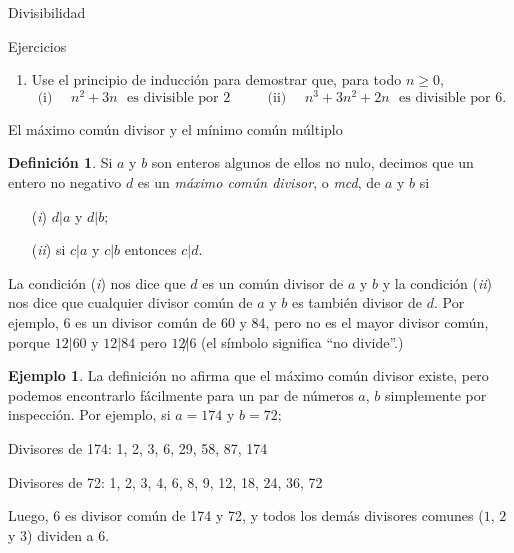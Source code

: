 \documentclass[11pt,spanish,makeidx]{amsbook}
\theoremstyle{definition}
\newtheorem{definicion}{Definici\'on}[section]
\newtheorem{ejemplo}{Ejemplo}[section]
\theoremstyle{remark}
\begin{document}
\begin{section}{Divisibilidad}
\begin{subsection}{Ejercicios}
\begin{enumerate}
\item Use el principio de inducción para demostrar que, para todo $n\ge0$,
$$
\text{ (i) } \quad n^2+3n \,\,\text{ es divisible por 2 } \qquad
\text{ (ii) } \quad n^3+3n^2+2n \,\,\text{ es divisible por 6. }
$$
\end{enumerate}
\end{subsection}
\end{section}

\begin{section}{El máximo común divisor y el mínimo común múltiplo}\label{1.7}

\begin{definicion}\label{mcd} Si $a$ y $b$ son enteros algunos de ellos no nulo, decimos que un entero no negativo $d$ es un {\em máximo común divisor}, o {\em mcd}, de $a$ y $b$ si
\begin{enumerate}
\item[({\em i})] $ d|a$ y $d|b$;
\item[({\em ii})] si $ c|a $ y $c|b$ entonces $ c|d$.
\end{enumerate}
\end{definicion}
La condición ({\em i}) nos dice que $d$ es un común divisor de $a$ y $b$ y la condición ({\em ii}) nos dice que cualquier divisor común de $a$ y $b$ es también divisor de $d$. Por ejemplo, 6 es un divisor común de 60 y 84, pero no es el mayor divisor común, porque $12|60$ y $12|84$ pero $12{\not|}6$ (el símbolo significa ``no divide''.)

\begin{ejemplo} La definición no afirma que el máximo común divisor existe, pero podemos encontrarlo fácilmente para un par de números $a$, $b$ simplemente por inspección. Por  ejemplo, si $a = 174$ y $b =72$;

Divisores de 174: 1, 2, 3, 6, 29, 58, 87, 174

Divisores de 72: 1, 2, 3, 4, 6, 8, 9, 12, 18, 24, 36, 72 

Luego, $6$ es divisor común de 174 y 72, y todos los demás divisores comunes ($1$, $2$ y $3$) dividen a $6$.
\end{ejemplo}


\end{section}
\end{document}
